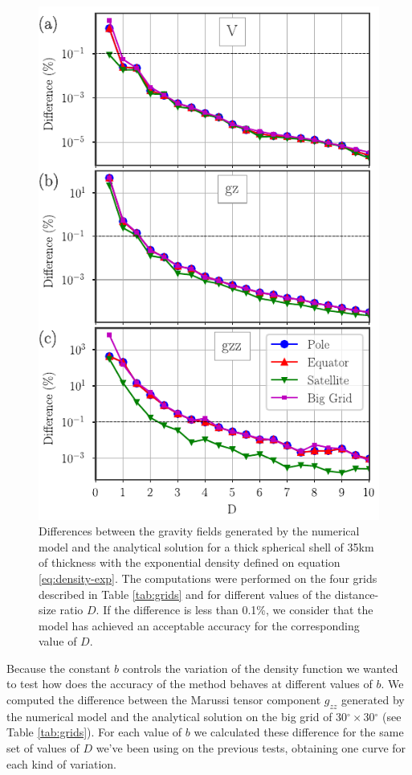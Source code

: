 \documentclass[extra]{gji}
\begin{document}
\begin{figure}
\centering
\includegraphics[width=0.9\linewidth]{figures/Dexp-shifted-thick-differences.pdf}
\caption{
    Differences between the gravity fields generated by the numerical model and the analytical solution for a thick spherical shell of 35km of thickness with the exponential density defined on equation \ref{eq:density-exp}. The computations were performed on the four grids described in Table \ref{tab:grids} and for different values of the distance-size ratio $D$. If the difference is less than 0.1\%, we consider that the model has achieved an acceptable accuracy for the corresponding value of $D$.
}
\label{fig:D-exp-thick}
\end{figure}

Because the constant $b$ controls the variation of the density function we wanted to test how does the accuracy of the method behaves at different values of $b$.
We computed the difference between the Marussi tensor component $g_{zz}$ generated by the numerical model and the analytical solution on the big grid of 30$^\circ\times$30$^\circ$ (see Table \ref{tab:grids}).
For each value of $b$ we calculated these difference for the same set of values of $D$ we've been using on the previous tests, obtaining one curve for each kind of variation.
\end{document}
